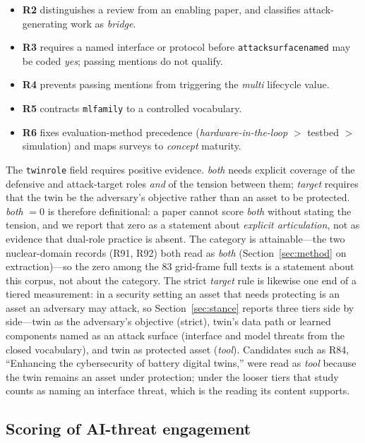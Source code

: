 \documentclass[preprint,12pt]{elsarticle}
\renewcommand{\_}{\plainunderscore\allowbreak}
\begin{document}
\begin{itemize}
  \item \textbf{R2} distinguishes a review from an enabling paper, and classifies
  attack-generating work as \emph{bridge}.
  \item \textbf{R3} requires a named interface or protocol before \texttt{attack\_surface\_named}
  may be coded \emph{yes}; passing mentions do not qualify.
  \item \textbf{R4} prevents passing mentions from triggering the \emph{multi} lifecycle value.
  \item \textbf{R5} contracts \texttt{ml\_family} to a controlled vocabulary.
  \item \textbf{R6} fixes evaluation-method precedence (\textit{hardware-in-the-loop} $>$
  testbed $>$ simulation) and maps surveys to \emph{concept} maturity.
\end{itemize}

The \texttt{twin\_role} field requires positive evidence. \emph{both} needs explicit coverage of
the defensive and attack-target roles \emph{and} of the tension between them; \emph{target}
requires that the twin be the adversary's objective rather than an asset to be protected.
\emph{both} $= 0$ is therefore definitional: a paper cannot score \emph{both} without stating
the tension, and we report that zero as a statement about \emph{explicit articulation}, not
as evidence that dual-role practice is absent. The category is attainable---the two
nuclear-domain records (R91, R92) both read as \emph{both}
(Section~\ref{sec:method} on extraction)---so the zero among the 83 grid-frame full texts
is a statement about this corpus, not about the category. The strict \emph{target} rule is likewise one
end of a tiered measurement: in a security setting an asset that needs protecting is an
asset an adversary may attack, so Section~\ref{sec:stance} reports three tiers side by
side---twin as the adversary's objective (strict), twin's data path or learned components
named as an attack surface (interface and model threats from the closed vocabulary), and
twin as protected asset (\emph{tool}). Candidates such as R84, ``Enhancing the
cybersecurity of battery digital twins,'' were read as \emph{tool} because the twin remains
an asset under protection; under the looser tiers that study counts as naming an interface
threat, which is the reading its content supports.

\subsection{Scoring of AI-threat engagement}
\end{document}
